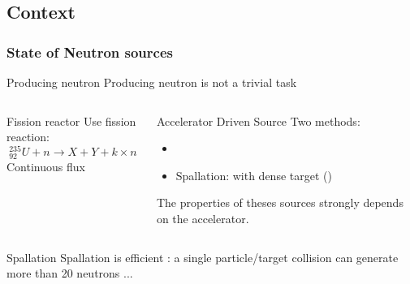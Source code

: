 \subsection{Context}
\begin{frame}
  \frametitle{State of Neutron sources}
  \begin{block}{Producing neutron}
    Producing neutron is not a trivial task
  \end{block}
  \begin{columns}
    \begin{column}{0.45\textwidth}
      \begin{block}{Fission reactor}
        Use fission reaction:
        \begin{equation*}
          _{92}^{235}U + n \rightarrow X + Y + k \times n
        \end{equation*}
        Continuous flux
      \end{block}
    \end{column}
    \begin{column}{0.45\textwidth}
      \begin{block}{Accelerator Driven Source}
        Two methods:
        \begin{itemize}
          \item
          \item Spallation: with dense target ()
        \end{itemize}
        The properties of theses sources strongly depends on the accelerator.
      \end{block}
    \end{column}
  \end{columns}
  \begin{block}{Spallation}
    Spallation is efficient : a single particle/target collision can generate more than 20 neutrons ...
  \end{block}
\end{frame}

